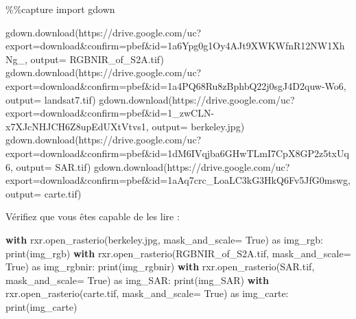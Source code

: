 \documentclass[
  11pt,
  letterpaper,
  open=any,
  twoside=false,
  french]{scrbook}
\newenvironment{Shaded}{\begin{snugshade}}{\end{snugshade}}
\newcommand{\BuiltInTok}[1]{\textcolor[rgb]{0.00,0.23,0.31}{#1}}
\newcommand{\ControlFlowTok}[1]{\textcolor[rgb]{0.00,0.23,0.31}{\textbf{#1}}}
\newcommand{\ImportTok}[1]{\textcolor[rgb]{0.00,0.46,0.62}{#1}}
\newcommand{\NormalTok}[1]{\textcolor[rgb]{0.00,0.23,0.31}{#1}}
\newcommand{\OperatorTok}[1]{\textcolor[rgb]{0.37,0.37,0.37}{#1}}
\newcommand{\StringTok}[1]{\textcolor[rgb]{0.13,0.47,0.30}{#1}}
\newcommand{\VariableTok}[1]{\textcolor[rgb]{0.07,0.07,0.07}{#1}}
\begin{document}
\begin{Shaded}
\begin{Highlighting}[]
\OperatorTok{\%\%}\NormalTok{capture}
\ImportTok{import}\NormalTok{ gdown}

\NormalTok{gdown.download(}\StringTok{\textquotesingle{}https://drive.google.com/uc?export=download\&confirm=pbef\&id=1a6Ypg0g1Oy4AJt9XWKWfnR12NW1XhNg\_\textquotesingle{}}\NormalTok{, output}\OperatorTok{=} \StringTok{\textquotesingle{}RGBNIR\_of\_S2A.tif\textquotesingle{}}\NormalTok{)}
\NormalTok{gdown.download(}\StringTok{\textquotesingle{}https://drive.google.com/uc?export=download\&confirm=pbef\&id=1a4PQ68Ru8zBphbQ22j0sgJ4D2quw{-}Wo6\textquotesingle{}}\NormalTok{, output}\OperatorTok{=} \StringTok{\textquotesingle{}landsat7.tif\textquotesingle{}}\NormalTok{)}
\NormalTok{gdown.download(}\StringTok{\textquotesingle{}https://drive.google.com/uc?export=download\&confirm=pbef\&id=1\_zwCLN{-}x7XJcNHJCH6Z8upEdUXtVtvs1\textquotesingle{}}\NormalTok{, output}\OperatorTok{=} \StringTok{\textquotesingle{}berkeley.jpg\textquotesingle{}}\NormalTok{)}
\NormalTok{gdown.download(}\StringTok{\textquotesingle{}https://drive.google.com/uc?export=download\&confirm=pbef\&id=1dM6IVqjba6GHwTLmI7CpX8GP2z5txUq6\textquotesingle{}}\NormalTok{, output}\OperatorTok{=} \StringTok{\textquotesingle{}SAR.tif\textquotesingle{}}\NormalTok{)}
\NormalTok{gdown.download(}\StringTok{\textquotesingle{}https://drive.google.com/uc?export=download\&confirm=pbef\&id=1aAq7crc\_LoaLC3kG3HkQ6Fv5JfG0mswg\textquotesingle{}}\NormalTok{, output}\OperatorTok{=} \StringTok{\textquotesingle{}carte.tif\textquotesingle{}}\NormalTok{)}
\end{Highlighting}
\end{Shaded}

Vérifiez que vous êtes capable de les lire :

\begin{Shaded}
\begin{Highlighting}[]
\ControlFlowTok{with}\NormalTok{ rxr.open\_rasterio(}\StringTok{\textquotesingle{}berkeley.jpg\textquotesingle{}}\NormalTok{, mask\_and\_scale}\OperatorTok{=} \VariableTok{True}\NormalTok{) }\ImportTok{as}\NormalTok{ img\_rgb:}
    \BuiltInTok{print}\NormalTok{(img\_rgb)}
\ControlFlowTok{with}\NormalTok{ rxr.open\_rasterio(}\StringTok{\textquotesingle{}RGBNIR\_of\_S2A.tif\textquotesingle{}}\NormalTok{, mask\_and\_scale}\OperatorTok{=} \VariableTok{True}\NormalTok{) }\ImportTok{as}\NormalTok{ img\_rgbnir:}
    \BuiltInTok{print}\NormalTok{(img\_rgbnir)}
\ControlFlowTok{with}\NormalTok{ rxr.open\_rasterio(}\StringTok{\textquotesingle{}SAR.tif\textquotesingle{}}\NormalTok{, mask\_and\_scale}\OperatorTok{=} \VariableTok{True}\NormalTok{) }\ImportTok{as}\NormalTok{ img\_SAR:}
    \BuiltInTok{print}\NormalTok{(img\_SAR)}
\ControlFlowTok{with}\NormalTok{ rxr.open\_rasterio(}\StringTok{\textquotesingle{}carte.tif\textquotesingle{}}\NormalTok{, mask\_and\_scale}\OperatorTok{=} \VariableTok{True}\NormalTok{) }\ImportTok{as}\NormalTok{ img\_carte:}
    \BuiltInTok{print}\NormalTok{(img\_carte)}
\end{Highlighting}
\end{Shaded}
\end{document}
